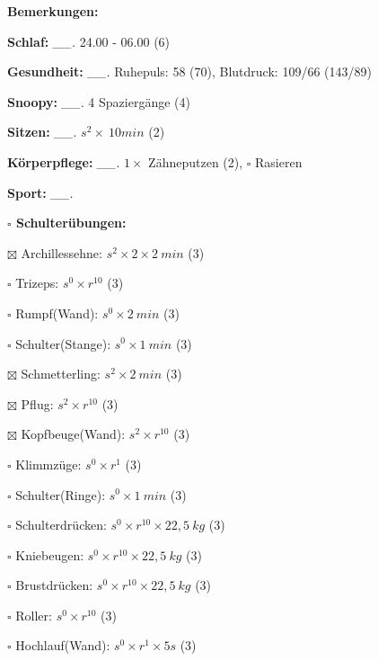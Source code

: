 \documentclass[10pt,a4paper]{article}
\newcommand\prop[1] {{\color {alizarin} {\bf #1}}}             %
\newcommand\mand[1] {{\color {burntorange} {\bf #1}}}          %
\newcommand\topspace{\vskip -15pt \hskip 20pt}
\newcommand\n[1] { {\sl #1.} \hskip 5pt }
\begin{document}
\begin{mdframed}[style=daystyle]
  \begin{labeling}{{\mand {Bemerkungen:}}}
    \setlength\itemsep{-3pt}
  \item[{\mand {Schlaf:}}]        \n{\_\_} 24.00 - 06.00 (6)
  \item[{\mand {Gesundheit:}}]    \n{\_\_} Ruhepuls: 58 (70), Blutdruck: 109/66 (143/89)
  \item[{\mand {Snoopy:}}]        \n{\_\_} 4 Spaziergänge (4)
  \item[{\mand {Sitzen:}}]        \n{\_\_} $s^2 \times\ 10 min$ (2)
  \item[{\mand {Körperpflege:}}]  \n{\_\_} $1 \times$ Zähneputzen (2), $\square$ Rasieren
  \item[{\mand {Sport:}}]         \n{\_\_}
    \topspace
    \begin{minipage}{0.75\textwidth}  
      \begin{labeling}{\prop {$\square$ {Schulterübungen:}}} 
        \setlength\itemsep{-3pt}
      \item[$\boxtimes$ Archillessehne:]   $s^2 \times 2 \times 2\ min$ (3)
      \item[$\square$ Trizeps:]          $s^0 \times r^{10}$ (3)
      \item[$\square$ Rumpf(Wand):]      $s^0 \times 2\ min$ (3)
      \item[$\square$ Schulter(Stange):] $s^0 \times 1\ min$ (3)
      \item[$\boxtimes$ Schmetterling:]    $s^2 \times 2\ min$ (3)
      \item[$\boxtimes$ Pflug:]            $s^2 \times r^{10}$ (3)
      \item[$\boxtimes$ Kopfbeuge(Wand):]  $s^2 \times r^{10}$ (3)
      \item[$\square$ Klimmzüge:]        $s^0 \times r^1$ (3)
      \item[$\square$ Schulter(Ringe):]  $s^0 \times 1\ min$ (3)
      \item[$\square$ Schulterdrücken:]  $s^0 \times r^{10} \times 22,5\ kg$ (3)
      \item[$\square$ Kniebeugen:]       $s^0 \times r^{10} \times 22,5\ kg$ (3)
      \item[$\square$ Brustdrücken:]     $s^0 \times r^{10} \times 22,5\ kg$ (3)
      \item[$\square$ Roller:]           $s^0 \times r^{10}$ (3)
      \item[$\square$ Hochlauf(Wand):]   $s^0 \times r^{1} \times 5s$ (3)

\end{labeling}
\end{minipage}
\end{labeling}
\end{mdframed}
\end{document}
